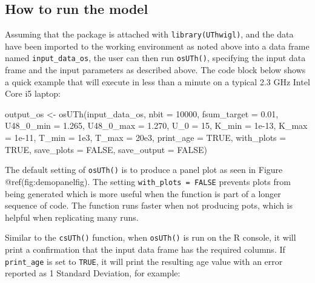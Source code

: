 \documentclass[]{elsarticle} %
\newenvironment{Shaded}{\begin{snugshade}}{\end{snugshade}}
\newcommand{\AttributeTok}[1]{\textcolor[rgb]{0.77,0.63,0.00}{#1}}
\newcommand{\ConstantTok}[1]{\textcolor[rgb]{0.00,0.00,0.00}{#1}}
\newcommand{\DecValTok}[1]{\textcolor[rgb]{0.00,0.00,0.81}{#1}}
\newcommand{\FloatTok}[1]{\textcolor[rgb]{0.00,0.00,0.81}{#1}}
\newcommand{\FunctionTok}[1]{\textcolor[rgb]{0.00,0.00,0.00}{#1}}
\newcommand{\NormalTok}[1]{#1}
\newcommand{\OtherTok}[1]{\textcolor[rgb]{0.56,0.35,0.01}{#1}}
\begin{document}
\hypertarget{how-to-run-the-model-1}{%
\subsection{How to run the model}\label{how-to-run-the-model-1}}

Assuming that the package is attached with \texttt{library(UThwigl)}, and the data have been imported to the working environment as noted above into a data frame named \texttt{input\_data\_os}, the user can then run \texttt{osUTh()}, specifying the input data frame and the input parameters as described above. The code block below shows a quick example that will execute in less than a minute on a typical 2.3 GHz Intel Core i5 laptop:

\begin{Shaded}
\begin{Highlighting}[]
\NormalTok{output\_os }\OtherTok{\textless{}{-}} \FunctionTok{osUTh}\NormalTok{(input\_data\_os,}
                   \AttributeTok{nbit =} \DecValTok{10000}\NormalTok{,}
                   \AttributeTok{fsum\_target =} \FloatTok{0.01}\NormalTok{,}
                   \AttributeTok{U48\_0\_min =} \FloatTok{1.265}\NormalTok{,}
                   \AttributeTok{U48\_0\_max =} \FloatTok{1.270}\NormalTok{,}
                   \AttributeTok{U\_0 =} \DecValTok{15}\NormalTok{,}
                   \AttributeTok{K\_min =} \FloatTok{1e{-}13}\NormalTok{,}
                   \AttributeTok{K\_max =} \FloatTok{1e{-}11}\NormalTok{,}
                   \AttributeTok{T\_min =} \FloatTok{1e3}\NormalTok{,}
                   \AttributeTok{T\_max =} \FloatTok{20e3}\NormalTok{,}
                   \AttributeTok{print\_age =} \ConstantTok{TRUE}\NormalTok{,}
                   \AttributeTok{with\_plots =} \ConstantTok{TRUE}\NormalTok{,}
                   \AttributeTok{save\_plots =} \ConstantTok{FALSE}\NormalTok{,}
                   \AttributeTok{save\_output =} \ConstantTok{FALSE}\NormalTok{)}
\end{Highlighting}
\end{Shaded}

The default setting of \texttt{osUTh()} is to produce a panel plot as seen in Figure @ref(fig:demopanelfig). The setting \texttt{with\_plots\ =\ FALSE} prevents plots from being generated which is more useful when the function is part of a longer sequence of code. The function runs faster when not producing pots, which is helpful when replicating many runs.

Similar to the \texttt{csUTh()} function, when \texttt{osUTh()} is run on the R console, it will print a confirmation that the input data frame has the required columns. If \texttt{print\_age} is set to \texttt{TRUE}, it will print the resulting age value with an error reported as 1 Standard Deviation, for example:
\end{document}
